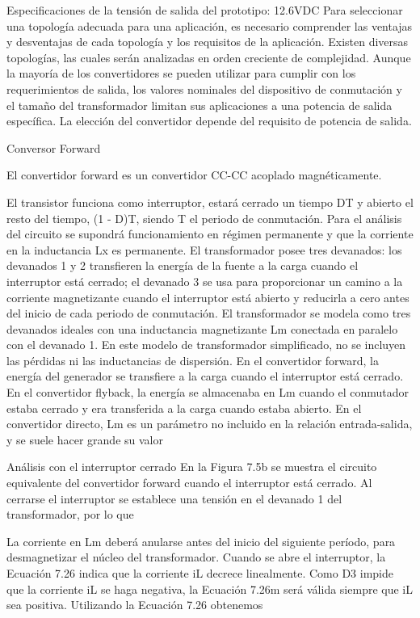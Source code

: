 Especificaciones de la tensión de salida del prototipo: 12.6VDC
Para seleccionar una topología adecuada para una aplicación, es necesario comprender las ventajas y desventajas de cada topología y los requisitos de la aplicación. 
Existen diversas topologías, las cuales serán analizadas en orden creciente de complejidad. 
Aunque la mayoría de los convertidores se pueden utilizar para cumplir con los requerimientos de salida, 
los valores nominales del dispositivo de conmutación y el tamaño del transformador limitan sus aplicaciones a una potencia de salida específica. 
La elección del convertidor depende del requisito de potencia de salida.


Conversor Forward


El convertidor forward es un convertidor CC-CC acoplado magnéticamente. 

El transistor funciona como interruptor, estará cerrado un tiempo DT y abierto el resto del tiempo,
 (1 - D)T, siendo T el periodo de conmutación. 
Para el análisis del circuito se supondrá funcionamiento 
en régimen permanente y que la corriente en la inductancia Lx es permanente.
El transformador posee tres devanados: los devanados 1 y 2 transfieren la energía de la
fuente a la carga cuando el interruptor está cerrado; el devanado 3 se usa para proporcionar un
camino a la corriente magnetizante cuando el interruptor está abierto y reducirla a cero antes del
inicio de cada periodo de conmutación. El transformador se modela como tres devanados ideales
con una inductancia magnetizante Lm conectada en paralelo con el devanado 1. En este modelo
de transformador simplificado, no se incluyen las pérdidas ni las inductancias de dispersión.
En el convertidor forward, la energía del generador se transfiere a la carga cuando el interruptor
está cerrado. En el convertidor flyback, la energía se almacenaba en Lm cuando el conmutador
estaba cerrado y era transferida a la carga cuando estaba abierto. En el convertidor directo, Lm
es un parámetro no incluido en la relación entrada-salida, y se suele hacer grande su valor

Análisis con el interruptor cerrado
En la Figura 7.5b se muestra el circuito equivalente del convertidor forward cuando el interruptor
está cerrado. Al cerrarse el interruptor se establece una tensión en el devanado 1 del transformador,
por lo que

La corriente en Lm deberá anularse antes del inicio del siguiente período, para desmagnetizar
el núcleo del transformador. Cuando se abre el interruptor, la Ecuación 7.26 indica que la corriente
iL decrece linealmente. Como D3 impide que la corriente iL se haga negativa, la Ecuación
7.26m será válida siempre que iL sea positiva. Utilizando la Ecuación 7.26 obtenemos



